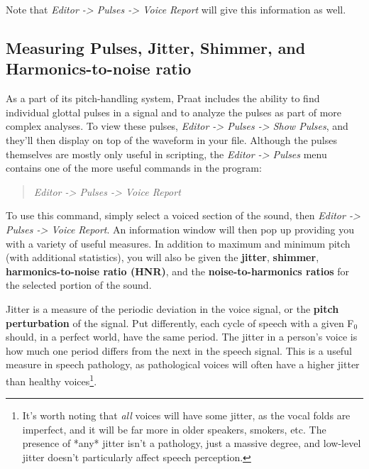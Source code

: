 Note that \emph{Editor -\textgreater{} Pulses -\textgreater{} Voice
Report} will give this information as well.

\hypertarget{measuring-pulses-jitter-shimmer-and-harmonics-to-noise-ratio}{%
\subsection{Measuring Pulses, Jitter, Shimmer, and Harmonics-to-noise
ratio}\label{measuring-pulses-jitter-shimmer-and-harmonics-to-noise-ratio}}

\label{pulsesjittershimmerhnr}

As a part of its pitch-handling system, Praat includes the ability to
find individual glottal pulses in a signal and to analyze the pulses as
part of more complex analyses. To view these pulses, \emph{Editor
-\textgreater{} Pulses -\textgreater{} Show Pulses}, and they'll then
display on top of the waveform in your file. Although the pulses
themselves are mostly only useful in scripting, the \emph{Editor
-\textgreater{} Pulses} menu contains one of the more useful commands in
the program:

\begin{quote}
\emph{Editor -\textgreater{} Pulses -\textgreater{} Voice Report}
\end{quote}

To use this command, simply select a voiced section of the sound, then
\emph{Editor -\textgreater{} Pulses -\textgreater{} Voice Report}. An
information window will then pop up providing you with a variety of
useful measures. In addition to maximum and minimum pitch (with
additional statistics), you will also be given the \textbf{jitter},
\textbf{shimmer}, \textbf{harmonics-to-noise ratio (HNR)}, and the
\textbf{noise-to-harmonics ratios} for the selected portion of the
sound.

Jitter is a measure of the periodic deviation in the voice signal, or
the \textbf{pitch perturbation} of the signal. Put differently, each
cycle of speech with a given F$_{0}$ should, in a perfect world, have the
same period. The jitter in a person's voice is how much one period
differs from the next in the speech signal. This is a useful measure in
speech pathology, as pathological voices will often have a higher jitter
than healthy
voices\footnote{It’s worth noting that \textit{all} voices will have some jitter, as the vocal folds are imperfect, and it will be far more in older speakers, smokers, etc.  The presence of *any* jitter isn't a pathology, just a massive degree, and low-level jitter doesn't particularly affect speech perception.}.

